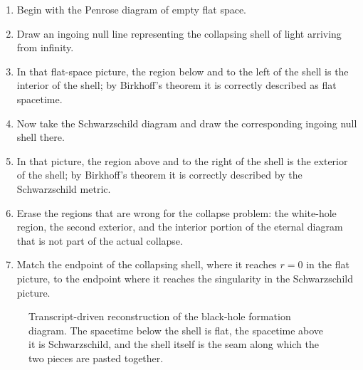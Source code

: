 \begin{enumerate}
\item Begin with the Penrose diagram of empty flat space.
\item Draw an ingoing null line representing the collapsing shell of light arriving from infinity.
\item In that flat-space picture, the region below and to the left of the shell is the interior of the shell; by Birkhoff's theorem it is correctly described as flat spacetime.
\item Now take the Schwarzschild diagram and draw the corresponding ingoing null shell there.
\item In that picture, the region above and to the right of the shell is the exterior of the shell; by Birkhoff's theorem it is correctly described by the Schwarzschild metric.
\item Erase the regions that are wrong for the collapse problem: the white-hole region, the second exterior, and the interior portion of the eternal diagram that is not part of the actual collapse.
\item Match the endpoint of the collapsing shell, where it reaches \(r=0\) in the flat picture, to the endpoint where it reaches the singularity in the Schwarzschild picture.
\end{enumerate}

\begin{figure}[ht]
\centering
{}
\caption{Transcript-driven reconstruction of the black-hole formation diagram. The spacetime below the shell is flat, the spacetime above it is Schwarzschild, and the shell itself is the seam along which the two pieces are pasted together.}
\end{figure}

